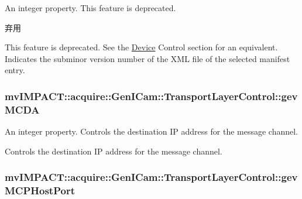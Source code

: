 An integer property. This feature is deprecated. 

\begin{DoxyRefDesc}{弃用}
\item[\hyperlink{deprecated__deprecated000089}{弃用}]This feature is deprecated. See the \hyperlink{classmv_i_m_p_a_c_t_1_1acquire_1_1_device}{Device} Control section for an equivalent. Indicates the subminor version number of the X\+M\+L file of the selected manifest entry. \end{DoxyRefDesc}
\hypertarget{classmv_i_m_p_a_c_t_1_1acquire_1_1_gen_i_cam_1_1_transport_layer_control_afe3ff79384a5b2e374001dc5d30aadbe}{
\subsubsection[{gev\+M\+C\+D\+A}]{ mv\+I\+M\+P\+A\+C\+T\+::acquire\+::\+Gen\+I\+Cam\+::\+Transport\+Layer\+Control\+::gev\+M\+C\+D\+A}}\label{classmv_i_m_p_a_c_t_1_1acquire_1_1_gen_i_cam_1_1_transport_layer_control_afe3ff79384a5b2e374001dc5d30aadbe}


An integer property. Controls the destination I\+P address for the message channel. 

Controls the destination I\+P address for the message channel. \hypertarget{classmv_i_m_p_a_c_t_1_1acquire_1_1_gen_i_cam_1_1_transport_layer_control_aa93010c6b4d9b6e13b957c46b66c0acb}{
\subsubsection[{gev\+M\+C\+P\+Host\+Port}]{ mv\+I\+M\+P\+A\+C\+T\+::acquire\+::\+Gen\+I\+Cam\+::\+Transport\+Layer\+Control\+::gev\+M\+C\+P\+Host\+Port}}\label{classmv_i_m_p_a_c_t_1_1acquire_1_1_gen_i_cam_1_1_transport_layer_control_aa93010c6b4d9b6e13b957c46b66c0acb}


